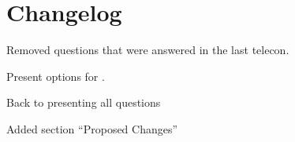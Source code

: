 \section{Changelog}
\begin{revision}
  \item Removed questions that were answered in the last telecon.
  \item Present options for .
\end{revision}

\begin{revision}
  \item Back to presenting all questions
  \item Added section “Proposed Changes”
\end{revision}
